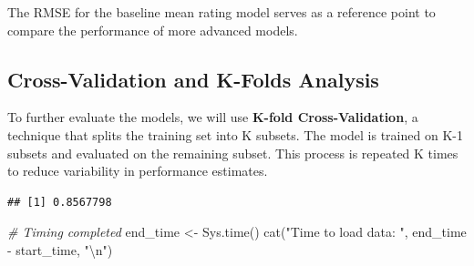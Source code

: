 \documentclass[
]{article}
\newenvironment{Shaded}{}{}
\newcommand{\AttributeTok}[1]{\textcolor[rgb]{0.49,0.56,0.16}{#1}}
\newcommand{\CommentTok}[1]{\textcolor[rgb]{0.38,0.63,0.69}{\textit{#1}}}
\newcommand{\DecValTok}[1]{\textcolor[rgb]{0.25,0.63,0.44}{#1}}
\newcommand{\FunctionTok}[1]{\textcolor[rgb]{0.02,0.16,0.49}{#1}}
\newcommand{\NormalTok}[1]{#1}
\newcommand{\OtherTok}[1]{\textcolor[rgb]{0.00,0.44,0.13}{#1}}
\newcommand{\SpecialCharTok}[1]{\textcolor[rgb]{0.25,0.44,0.63}{#1}}
\newcommand{\StringTok}[1]{\textcolor[rgb]{0.25,0.44,0.63}{#1}}
\begin{document}
The RMSE for the baseline mean rating model serves as a reference point
to compare the performance of more advanced models.

\subsection{Cross-Validation and K-Folds
Analysis}\label{cross-validation-and-k-folds-analysis}

To further evaluate the models, we will use \textbf{K-fold
Cross-Validation}, a technique that splits the training set into K
subsets. The model is trained on K-1 subsets and evaluated on the
remaining subset. This process is repeated K times to reduce variability
in performance estimates.

\begin{Shaded}
\end{Shaded}

\begin{verbatim}
## [1] 0.8567798
\end{verbatim}

\begin{Shaded}
\begin{Highlighting}[]
\CommentTok{\# Timing completed}
\NormalTok{end\_time }\OtherTok{\textless{}{-}} \FunctionTok{Sys.time}\NormalTok{()}
\FunctionTok{cat}\NormalTok{(}\StringTok{"Time to load data: "}\NormalTok{, end\_time }\SpecialCharTok{{-}}\NormalTok{ start\_time, }\StringTok{"}\SpecialCharTok{\textbackslash{}n}\StringTok{"}\NormalTok{)}
\end{Highlighting}
\end{Shaded}
\end{document}
